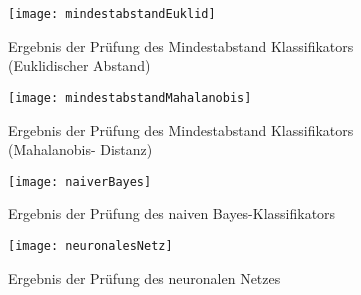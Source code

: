 \begin{figure}[ht]
\centering
\texttt{[image: mindestabstandEuklid]}
\caption{Ergebnis der Pr\"ufung des Mindestabstand Klassifikators (Euklidischer
Abstand)}
\end{figure}

\begin{figure}[ht]
\centering
\texttt{[image: mindestabstandMahalanobis]}
\caption{Ergebnis der Pr\"ufung des Mindestabstand Klassifikators (Mahalanobis-%
Distanz)}
\end{figure}

\begin{figure}[ht]
\centering
\texttt{[image: naiverBayes]}
\caption{Ergebnis der Pr\"ufung des naiven Bayes-Klassifikators}
\end{figure}

\begin{figure}[ht]
\centering
\texttt{[image: neuronalesNetz]}
\caption{Ergebnis der Pr\"ufung des neuronalen Netzes}
\end{figure}